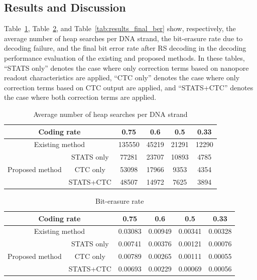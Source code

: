\documentclass[sotsuron]{kuee}
\begin{document}
\subsection{Results and Discussion}
Table~\ref{tab:results_heap}, Table~\ref{tab:results_deletion}, and
Table~\ref{tab:results_final_ber} show, respectively, the average number of
heap searches per DNA strand, the bit-erasure rate due to decoding failure, and
the final bit error rate after RS decoding in the decoding performance
evaluation of the existing and proposed methods.
In these tables, ``STATS only'' denotes the case where only correction terms
based on nanopore readout characteristics are applied, ``CTC only'' denotes the
case where only correction terms based on CTC output are applied, and
``STATS+CTC'' denotes the case where both correction terms are applied.
\begin{table}
  \centering
  \caption{Average number of heap searches per DNA strand}
  \label{tab:results_heap}
  \begin{tabular}{c|c|cccc}
    \hline
    \multicolumn{2}{c|}{Coding rate} & 0.75 & 0.6 & 0.5 & 0.33 \\
    \hline
    \multicolumn{2}{c|}{Existing method} & 135550 & 45219 & 21291 & 12290 \\
    \hline
    \multirow{3}{*}{Proposed method} & STATS only & 77281 & 23707 & 10893 & 4785 \\
    \cline{2-6}
     & CTC only & 53098 & 17966 & 9353 & 4354 \\
    \cline{2-6}
     & STATS+CTC & 48507 & 14972 & 7625 & 3894 \\
    \hline
  \end{tabular}
\end{table}
\begin{table}
  \centering
  \caption{Bit-erasure rate}
  \label{tab:results_deletion}
  \begin{tabular}{c|c|cccc}
    \hline
    \multicolumn{2}{c|}{Coding rate} & 0.75 & 0.6 & 0.5 & 0.33 \\
    \hline
    \multicolumn{2}{c|}{Existing method} & 0.03083 & 0.00949 & 0.00341 & 0.00328 \\
    \hline
    \multirow{3}{*}{Proposed method} & STATS only & 0.00741 & 0.00376 & 0.00121 & 0.00076 \\
    \cline{2-6}
     & CTC only & 0.00789 & 0.00265 & 0.00111 & 0.00055 \\
    \cline{2-6}
     & STATS+CTC & 0.00693 & 0.00229 & 0.00069 & 0.00056 \\
    \hline
  \end{tabular}
\end{table}
\end{document}
